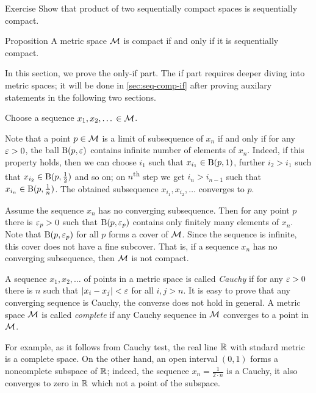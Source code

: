 {\sloppy

\begin{thm}{Exercise}\label{ex:product-sequentially-compact}
Show that product of two sequentially compact spaces is sequentially compact.
\end{thm}

}

\begin{thm}{Proposition}\label{prop:seq-comp-metr}
A metric space $\mathcal{M}$ is compact if and only if it is sequentially compact.
\end{thm}

In this section, we prove the only-if part.
The if part requires deeper diving into metric spaces; it will be done in \ref{sec:seq-comp-if} after proving auxilary statements in the following two sections.

Choose a sequence $x_1,x_2,\dots{}\in \mathcal{M}$.

Note that a point $p\in \mathcal{M}$ is a limit of subsequence of $x_n$ if and only if for any $\varepsilon>0$, the ball $\mathrm{B}(p,\varepsilon)$ contains infinite number of elements of $x_n$.
Indeed, if this property holds, then we can choose $i_1$ such that $x_{i_1}\in \mathrm{B}(p,1)$, further $i_2>i_1$ such that $x_{i_2}\in \mathrm{B}(p,\tfrac12)$ and so on; on $n$\textsuperscript{th} step we get $i_n>i_{n-1}$ such that $x_{i_n}\in \mathrm{B}(p,\tfrac1n)$.
The obtained subsequence $x_{i_1},x_{i_2},\dots$ converges to $p$.

Assume the sequence $x_n$ has no converging subsequence.
Then for any point $p$ there is $\varepsilon_p>0$ such that $\mathrm{B}(p,\varepsilon_p)$ contains only finitely many elements of $x_n$.
Note that $\mathrm{B}(p,\varepsilon_p)$ for all $p$ forms a cover of $\mathcal{M}$.
Since the sequence is infinite, this cover does not have a fine subcover.
That is, if a sequence $x_n$ has no converging subsequence, then $\mathcal{M}$ is not compact.
\qeds

A sequence $x_1,x_2,\dots$ of points in a metric space is called \emph{Cauchy} if
for any $\varepsilon>0$ there is $n$ such that $|x_i-x_j|<\varepsilon$ for all $i,j>n$.
It is easy to prove that any converging sequence is Cauchy, the converse does not hold in general.
A metric space $\mathcal{M}$ is called \emph{complete} if any Cauchy sequence in $\mathcal{M}$ converges to a point in $\mathcal{M}$.

For example, as it follows from Cauchy test, the real line $\mathbb{R}$ with stndard metric is a complete space.
On the other hand, an open interval $(0,1)$ forms a noncomplete subspace of $\mathbb{R}$;
indeed, the sequence $x_n=\tfrac 1{2\cdot n}$ is a Cauchy, it also converges to zero in $\mathbb{R}$ which not a point of the subspace.

